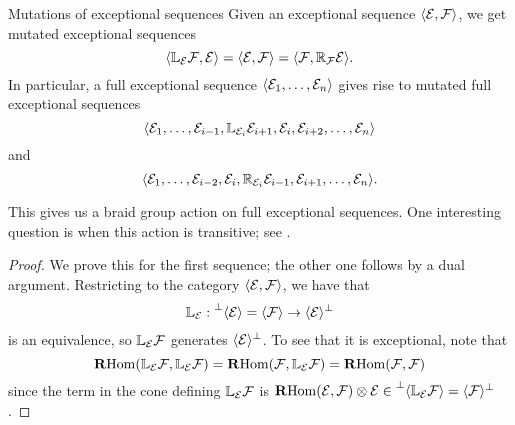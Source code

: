 \begin{corollary}{Mutations of exceptional sequences}{}
    Given an exceptional sequence $\langle\mathcal{E},\mathcal{F}\rangle$, we get mutated
    exceptional sequences
    \begin{equation*}
        \langle\mathbb{L}_{\mathcal{E}}\mathcal{F},\mathcal{E}\rangle
            = \langle\mathcal{E},\mathcal{F}\rangle
            = \langle\mathcal{F},\mathbb{R}_{\mathcal{F}}\mathcal{E}\rangle.
    \end{equation*}
    In particular, a full exceptional sequence
    $\langle\mathcal{E}_1,\ldots,\mathcal{E}_n\rangle$ gives rise to mutated full
    exceptional sequences
    \begin{equation*}
        \langle\mathcal{E}_1,\ldots,
            \mathcal{E}_{i-1},\mathbb{L}_{\mathcal{E}_i}\mathcal{E}_{i+1},\mathcal{E}_i,\mathcal{E}_{i+2},\ldots,
            \mathcal{E}_n\rangle
    \end{equation*}
    and
    \begin{equation*}
        \langle\mathcal{E}_1,\ldots,
            \mathcal{E}_{i-2},\mathcal{E}_i,\mathbb{R}_{\mathcal{E}_i}\mathcal{E}_{i-1},\mathcal{E}_{i+1},\ldots,
            \mathcal{E}_n\rangle.
    \end{equation*}
\end{corollary}

\begin{remark}{}{}
    This gives us a braid group action on full exceptional sequences. One
    interesting question is when this action is transitive; see
    \cite{chang2023braid}.
\end{remark}

\begin{proof}
    We prove this for the first sequence; the other one follows by a dual
    argument. Restricting to the category $\langle\mathcal{E},\mathcal{F}\rangle$, we have
    that
    \begin{equation*}
        \mathbb{L}_{\mathcal{E}}:
            \prescript{\perp}{}{\langle}\mathcal{E}\rangle=\langle\mathcal{F}\rangle
            \to\langle\mathcal{E}\rangle^\perp
    \end{equation*}
    is an equivalence, so $\mathbb{L}_{\mathcal{E}}\mathcal{F}$ generates
    $\langle\mathcal{E}\rangle^\perp$. To see that it is exceptional, note that
    \begin{equation*}
        \operatorname{\mathbf{R} Hom}(\mathbb{L}_{\mathcal{E}}\mathcal{F},\mathbb{L}_{\mathcal{E}}\mathcal{F})
            = \operatorname{\mathbf{R} Hom}(\mathcal{F},\mathbb{L}_{\mathcal{E}}\mathcal{F})
            = \operatorname{\mathbf{R} Hom}(\mathcal{F},\mathcal{F})
    \end{equation*}
    since the term in the cone defining $\mathbb{L}_{\mathcal{E}}\mathcal{F}$ is
    $\operatorname{\mathbf{R} Hom}(\mathcal{E},\mathcal{F})\otimes\mathcal{E}
    \in\prescript{\perp}{}{\langle}\mathbb{L}_{\mathcal{E}}\mathcal{F}\rangle
    =\langle\mathcal{F}\rangle^\perp$.
\end{proof}

